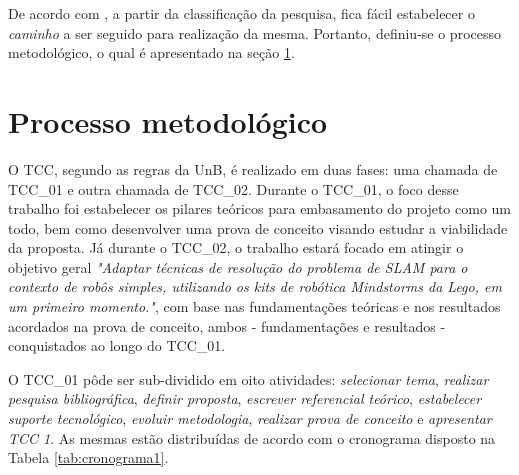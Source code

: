 	De acordo com \cite{fundamentosMetodologia}, a partir da classificação da pesquisa, fica fácil estabelecer o \textit{caminho} a ser seguido para realização da mesma. Portanto, definiu-se o processo metodológico, o qual é apresentado na seção \ref{sec:processo_metodológico}.


\section{Processo metodológico} %
\label{sec:processo_metodológico}


O TCC, segundo as regras da UnB, é realizado em duas fases: uma chamada de TCC\_01 e outra chamada de TCC\_02. Durante o TCC\_01, o foco desse trabalho foi estabelecer os pilares teóricos para embasamento do projeto como um todo, bem como desenvolver uma prova de conceito visando estudar a viabilidade da proposta. Já durante o TCC\_02, o trabalho estará focado em atingir o objetivo geral \textit{"Adaptar técnicas de resolução do problema de SLAM para o contexto de robôs simples, utilizando os kits de robótica Mindstorms da Lego, em um primeiro momento."}, com base nas fundamentações teóricas e nos resultados acordados na prova de conceito, ambos - fundamentações e resultados - conquistados ao longo do TCC\_01.

O TCC\_01 pôde ser sub-dividido em oito atividades: \textit{selecionar tema}, \textit{realizar pesquisa bibliográfica}, \textit{definir proposta}, \textit{escrever referencial teórico}, \textit{estabelecer suporte tecnológico}, \textit{evoluir metodologia}, \textit{realizar prova de conceito} e \textit{apresentar TCC 1}. As mesmas estão distribuídas de acordo com o cronograma disposto na Tabela \ref{tab:cronograma1}.

